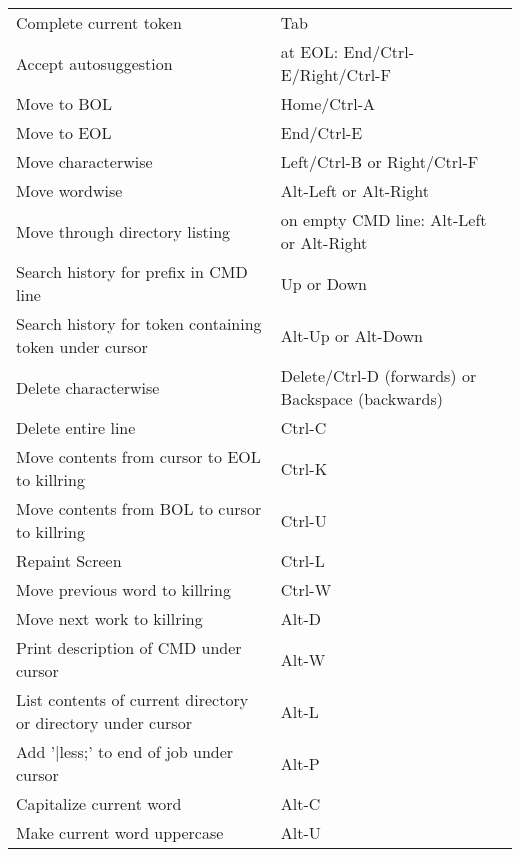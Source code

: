 \documentclass[10pt]{extarticle}
\begin{document}
\begin{paracol}{2}
\begin{tabularx}{\columnwidth}{X >{\ttfamily}X}
    Complete current token & Tab \\
    Accept autosuggestion & at EOL: End/Ctrl-E/Right/Ctrl-F \\
    Move to BOL & Home/Ctrl-A \\
    Move to EOL & End/Ctrl-E \\
    Move characterwise & Left/Ctrl-B or Right/Ctrl-F \\
    Move wordwise & Alt-Left or Alt-Right \\
    Move through directory listing & on empty CMD line: Alt-Left or Alt-Right \\
    Search history for prefix in CMD line & Up or Down \\
    Search history for token containing token under cursor & Alt-Up or Alt-Down \\
    Delete characterwise & Delete/Ctrl-D (forwards) or Backspace (backwards) \\
    Delete entire line & Ctrl-C \\
    Move contents from cursor to EOL to killring & Ctrl-K \\
    Move contents from BOL to cursor to killring & Ctrl-U \\
    Repaint Screen & Ctrl-L \\
    Move previous word to killring & Ctrl-W \\
    Move next work to killring & Alt-D \\
    Print description of CMD under cursor & Alt-W \\
    List contents of current directory or directory under cursor & Alt-L \\
    Add '|less;' to end of job under cursor & Alt-P \\
    Capitalize current word & Alt-C \\
    Make current word uppercase & Alt-U
\end{tabularx}

\end{paracol}
\end{document}
